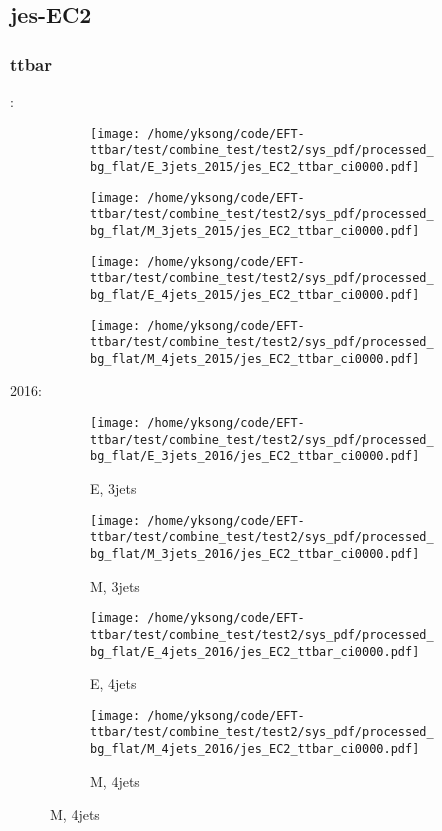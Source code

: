 \documentclass{beamer}
\begin{document}
\subsection{jes-EC2}

\begin{frame}
\frametitle{ttbar}
\fontsize{5}{1}:
\begin{figure}
\centering
\begin{subfigure}[b]{0.24\textwidth}
\texttt{[image: /home/yksong/code/EFT-ttbar/test/combine\_test/test2/sys\_pdf/processed\_bg\_flat/E\_3jets\_2015/jes\_EC2\_ttbar\_ci0000.pdf]}
\end{subfigure}
\begin{subfigure}[b]{0.24\textwidth}
\texttt{[image: /home/yksong/code/EFT-ttbar/test/combine\_test/test2/sys\_pdf/processed\_bg\_flat/M\_3jets\_2015/jes\_EC2\_ttbar\_ci0000.pdf]}
\end{subfigure}
\begin{subfigure}[b]{0.24\textwidth}
\texttt{[image: /home/yksong/code/EFT-ttbar/test/combine\_test/test2/sys\_pdf/processed\_bg\_flat/E\_4jets\_2015/jes\_EC2\_ttbar\_ci0000.pdf]}
\end{subfigure}
\begin{subfigure}[b]{0.24\textwidth}
\texttt{[image: /home/yksong/code/EFT-ttbar/test/combine\_test/test2/sys\_pdf/processed\_bg\_flat/M\_4jets\_2015/jes\_EC2\_ttbar\_ci0000.pdf]}
\end{subfigure}
\end{figure}
2016:
\begin{figure}
\centering
\begin{subfigure}[b]{0.24\textwidth}
\texttt{[image: /home/yksong/code/EFT-ttbar/test/combine\_test/test2/sys\_pdf/processed\_bg\_flat/E\_3jets\_2016/jes\_EC2\_ttbar\_ci0000.pdf]}
\captionsetup{font=tiny}
\caption{E, 3jets}
\end{subfigure}
\begin{subfigure}[b]{0.24\textwidth}
\texttt{[image: /home/yksong/code/EFT-ttbar/test/combine\_test/test2/sys\_pdf/processed\_bg\_flat/M\_3jets\_2016/jes\_EC2\_ttbar\_ci0000.pdf]}
\captionsetup{font=tiny}
\caption{M, 3jets}
\end{subfigure}
\begin{subfigure}[b]{0.24\textwidth}
\texttt{[image: /home/yksong/code/EFT-ttbar/test/combine\_test/test2/sys\_pdf/processed\_bg\_flat/E\_4jets\_2016/jes\_EC2\_ttbar\_ci0000.pdf]}
\captionsetup{font=tiny}
\caption{E, 4jets}
\end{subfigure}
\begin{subfigure}[b]{0.24\textwidth}
\texttt{[image: /home/yksong/code/EFT-ttbar/test/combine\_test/test2/sys\_pdf/processed\_bg\_flat/M\_4jets\_2016/jes\_EC2\_ttbar\_ci0000.pdf]}
\captionsetup{font=tiny}
\caption{M, 4jets}
\end{subfigure}
\end{figure}
\end{frame}
\end{document}

